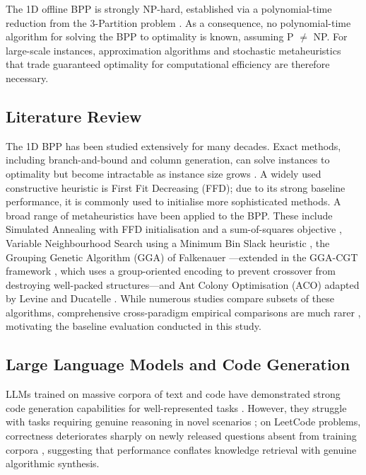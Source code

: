 \documentclass[11pt]{article}
\begin{document}
The 1D offline BPP is strongly NP-hard, established via a polynomial-time reduction from the 3-Partition problem \cite{garey}. As a consequence, no polynomial-time algorithm for solving the BPP to optimality is known, assuming P $\neq$ NP. For large-scale instances, approximation algorithms and stochastic metaheuristics that trade guaranteed optimality for computational efficiency are therefore necessary.

\subsection{Literature Review}

The 1D BPP has been studied extensively for many decades. Exact methods, including branch-and-bound and column generation, can solve instances to optimality but become intractable as instance size grows \cite{garey, maxence}. A widely used constructive heuristic is First Fit Decreasing (FFD); due to its strong baseline performance, it is commonly used to initialise more sophisticated methods. A broad range of metaheuristics have been applied to the BPP. These include Simulated Annealing with FFD initialisation and a sum-of-squares objective \cite{sonuc}, Variable Neighbourhood Search using a Minimum Bin Slack heuristic \cite{kryz}, the Grouping Genetic Algorithm (GGA) of Falkenauer \cite{gga}---extended in the GGA-CGT framework \cite{quirozca}, which uses a group-oriented encoding to prevent crossover from destroying well-packed structures---and Ant Colony Optimisation (ACO) adapted by Levine and Ducatelle \cite{levine}. While numerous studies compare subsets of these algorithms, comprehensive cross-paradigm empirical comparisons are much rarer \cite{munien}, motivating the baseline evaluation conducted in this study.

\subsection{Large Language Models and Code Generation}

LLMs trained on massive corpora of text and code have demonstrated strong code generation capabilities for well-represented tasks \cite{chang}. However, they struggle with tasks requiring genuine reasoning in novel scenarios \cite{kucharavy}; on LeetCode problems, correctness deteriorates sharply on newly released questions absent from training corpora \cite{coignion}, suggesting that performance conflates knowledge retrieval with genuine algorithmic synthesis.
\end{document}
